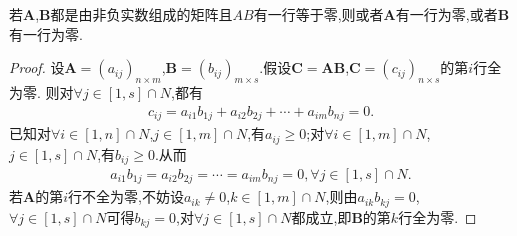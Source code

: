 \documentclass[lang=cn,newtx,10pt,scheme=chinese]{elegantbook}
\begin{document}
\begin{proposition}
若\(\boldsymbol{A}\),\(\boldsymbol{B}\)都是由非负实数组成的矩阵且\(AB\)有一行等于零,则或者\(\boldsymbol{A}\)有一行为零,或者\(\boldsymbol{B}\)有一行为零.
\end{proposition}
\begin{proof}
    设\(\boldsymbol{A} = (a_{ij})_{n\times m}\),\(\boldsymbol{B} = (b_{ij})_{m\times s}\).假设\(\boldsymbol{C} = \boldsymbol{AB}\),\(\boldsymbol{C} = (c_{ij})_{n\times s}\)的第\(i\)行全为零.
则对\(\forall j\in [1,s]\cap N\),都有
\begin{align*}
   c_{ij} = a_{i1}b_{1j} + a_{i2}b_{2j} + \cdots + a_{im}b_{nj} = 0 .
\end{align*}
已知对\(\forall i\in [1,n]\cap N\),\(j\in [1,m]\cap N\),有\(a_{ij} \geq 0\);对\(\forall i\in [1,m]\cap N\),\(j\in [1,s]\cap N\),有\(b_{ij} \geq 0\).从而
\begin{align*}
    a_{i1}b_{1j} = a_{i2}b_{2j} = \cdots = a_{im}b_{nj} = 0,\forall j\in [1,s]\cap N.
\end{align*}
若\(\boldsymbol{A}\)的第\(i\)行不全为零,不妨设\(a_{ik} \neq 0\),\(k\in [1,m]\cap N\),则由\(a_{ik}b_{kj} = 0\),\(\forall j\in [1,s]\cap N\)可得\(b_{kj} = 0\),对\(\forall j\in [1,s]\cap N\)都成立,即\(\boldsymbol{B}\)的第\(k\)行全为零. 
\end{proof}
\end{document}
